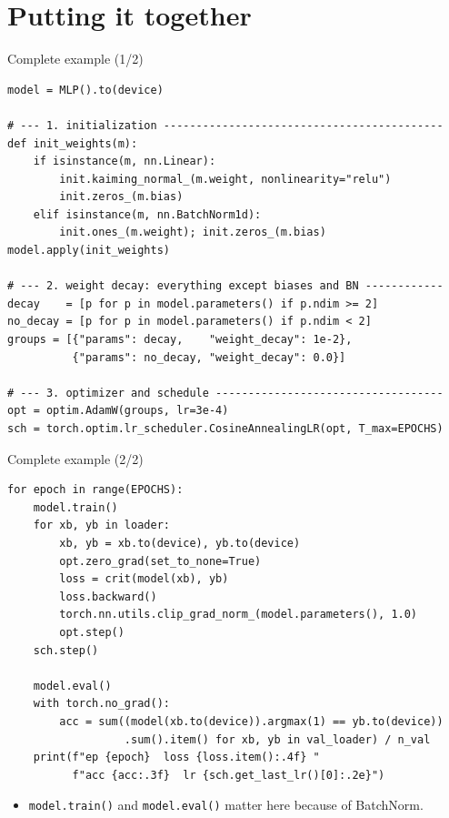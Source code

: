 \documentclass[10pt,aspectratio=169]{beamer}
\begin{document}
\section{Putting it together}

\begin{frame}[fragile]{Complete example (1/2)}
\begin{lstlisting}[basicstyle=\ttfamily\scriptsize]
model = MLP().to(device)

# --- 1. initialization -------------------------------------------
def init_weights(m):
    if isinstance(m, nn.Linear):
        init.kaiming_normal_(m.weight, nonlinearity="relu")
        init.zeros_(m.bias)
    elif isinstance(m, nn.BatchNorm1d):
        init.ones_(m.weight); init.zeros_(m.bias)
model.apply(init_weights)

# --- 2. weight decay: everything except biases and BN ------------
decay    = [p for p in model.parameters() if p.ndim >= 2]
no_decay = [p for p in model.parameters() if p.ndim < 2]
groups = [{"params": decay,    "weight_decay": 1e-2},
          {"params": no_decay, "weight_decay": 0.0}]

# --- 3. optimizer and schedule -----------------------------------
opt = optim.AdamW(groups, lr=3e-4)
sch = torch.optim.lr_scheduler.CosineAnnealingLR(opt, T_max=EPOCHS)
\end{lstlisting}
\end{frame}

\begin{frame}[fragile]{Complete example (2/2)}
\begin{lstlisting}[basicstyle=\ttfamily\scriptsize]
for epoch in range(EPOCHS):
    model.train()
    for xb, yb in loader:
        xb, yb = xb.to(device), yb.to(device)
        opt.zero_grad(set_to_none=True)
        loss = crit(model(xb), yb)
        loss.backward()
        torch.nn.utils.clip_grad_norm_(model.parameters(), 1.0)
        opt.step()
    sch.step()

    model.eval()
    with torch.no_grad():
        acc = sum((model(xb.to(device)).argmax(1) == yb.to(device))
                  .sum().item() for xb, yb in val_loader) / n_val
    print(f"ep {epoch}  loss {loss.item():.4f} "
          f"acc {acc:.3f}  lr {sch.get_last_lr()[0]:.2e}")
\end{lstlisting}
\begin{itemize}
    \item \texttt{model.train()} and \texttt{model.eval()} matter here because of BatchNorm.
\end{itemize}
\end{frame}
\end{document}
